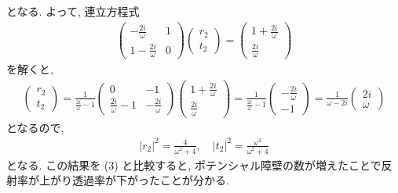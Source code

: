 \documentclass[../../ou-physics-exam.tex]{subfiles}
\begin{document}
\begin{answer}
    となる. 
    よって, 連立方程式
    \begin{align*}
        \begin{pmatrix}
            - \frac{2i}{\omega} & 1 \\
            1 - \frac{2i}{\omega} & 0
        \end{pmatrix}
        \begin{pmatrix}
            r_2 \\ t_2
        \end{pmatrix} = 
        \begin{pmatrix}
            1 + \frac{2i}{\omega} \\ \frac{2i}{\omega}
        \end{pmatrix}
    \end{align*}
    を解くと,
    \begin{align*}
        \begin{pmatrix}
            r_2 \\ t_2
        \end{pmatrix}
        = \frac{1}{\frac{2i}{\omega} - 1} 
        \begin{pmatrix}
            0 & -1 \\
            \frac{2i}{\omega} - 1 & - \frac{2i}{\omega}
        \end{pmatrix}
        \begin{pmatrix}
            1 + \frac{2i}{\omega} \\ \frac{2i}{\omega}
        \end{pmatrix}
        = \frac{1}{\frac{2i}{\omega} - 1} 
        \begin{pmatrix}
            - \frac{2i}{\omega} \\ -1
        \end{pmatrix}
        = \frac{1}{\omega - 2i}
        \begin{pmatrix}
            2i \\ \omega
        \end{pmatrix}
    \end{align*}
    となるので,
    \begin{align*}
        |r_2|^2 = \frac{4}{\omega^2 + 4}, \quad |t_2|^2 = \frac{\omega^2}{\omega^2 + 4}
    \end{align*}
    となる. 
    この結果を (3) と比較すると, ポテンシャル障壁の数が増えたことで反射率が上がり透過率が下がったことが分かる.
\end{answer}
\end{document}
